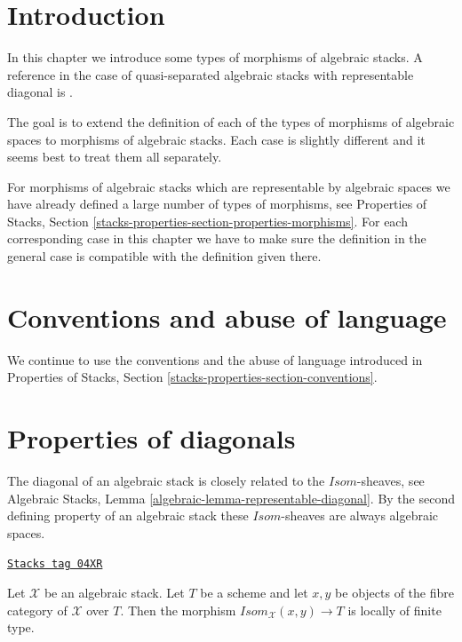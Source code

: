 \section{Introduction}
\label{stacks-morphisms-section-introduction}
In this chapter we introduce some types of morphisms of algebraic stacks.
A reference in the case of quasi-separated algebraic stacks with representable
diagonal is \cite{LM-B}.

\medskip\noindent
The goal is to extend the definition of each of the types of morphisms of
algebraic spaces to morphisms of algebraic stacks. Each case is slightly
different and it seems best to treat them all separately.

\medskip\noindent
For morphisms of algebraic stacks which are representable
by algebraic spaces we have already defined a large number of types of
morphisms, see
Properties of Stacks,
Section \ref{stacks-properties-section-properties-morphisms}.
For each corresponding case in this chapter
we have to make sure the definition in the general
case is compatible with the definition given there.

\section{Conventions and abuse of language}
\label{stacks-morphisms-section-conventions}
We continue to use the conventions and the abuse of language
introduced in
Properties of Stacks, Section \ref{stacks-properties-section-conventions}.

\section{Properties of diagonals}
\label{stacks-morphisms-section-diagonals}
The diagonal of an algebraic stack is closely related to the
$\mathit{Isom}$-sheaves, see
Algebraic Stacks, Lemma \ref{algebraic-lemma-representable-diagonal}.
By the second defining property of an algebraic stack these
$\mathit{Isom}$-sheaves are always algebraic spaces.

\begin{lemma}
\label{stacks-morphisms-lemma-isom-locally-finite-type}
\href{https://stacks.math.columbia.edu/tag/04XR}{\texttt{Stacks tag 04XR}}

Let $\mathcal{X}$ be an algebraic stack.
Let $T$ be a scheme and let $x, y$ be objects of the fibre category of
$\mathcal{X}$ over $T$. Then the morphism
$\mathit{Isom}_\mathcal{X}(x, y) \to T$ is locally of finite type.
\end{lemma}

